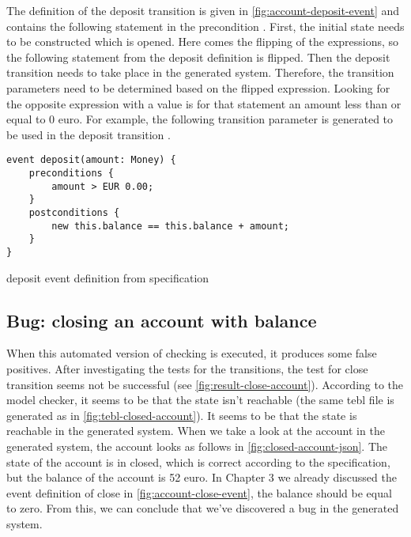 The definition of the deposit transition is given in \autoref{fig:account-deposit-event} and contains the following statement in the precondition . First, the initial state needs to be constructed which is opened. Here comes the flipping of the expressions, so the following statement from the deposit definition  is flipped. Then the deposit transition needs to take place in the generated system. Therefore, the transition parameters need to be determined based on the flipped expression. Looking for the opposite expression with a value is for that statement an amount less than or equal to 0 euro. For example, the following transition parameter is generated to be used in the deposit transition . 

\begin{sourcecode}[h!]
\begin{lstlisting}[]
event deposit(amount: Money) {
	preconditions {
		amount > EUR 0.00;
	} 
	postconditions {
		new this.balance == this.balance + amount;
	}
}
\end{lstlisting}
\caption{deposit event definition from specification}
\label{fig:account-deposit-event}
\end{sourcecode}

\subsection{Bug: closing an account with balance}
\label{sec:bug-close-account}
When this automated version of checking is executed, it produces some false positives. After investigating the tests for the transitions, the test for close transition seems not be successful (see \autoref{fig:result-close-account}). According to the model checker, it seems to be that the state isn't reachable (the same tebl file is generated as in \autoref{fig:tebl-closed-account}). It seems to be that the state is reachable in the generated system. When we take a look at the account in the generated system, the account looks as follows in \autoref{fig:closed-account-json}. The state of the account is in closed, which is correct according to the specification, but the balance of the account is 52 euro. In Chapter 3 we already discussed the event definition of close in \autoref{fig:account-close-event}, the balance should be equal to zero. From this, we can conclude that we've discovered a bug in the generated system.

